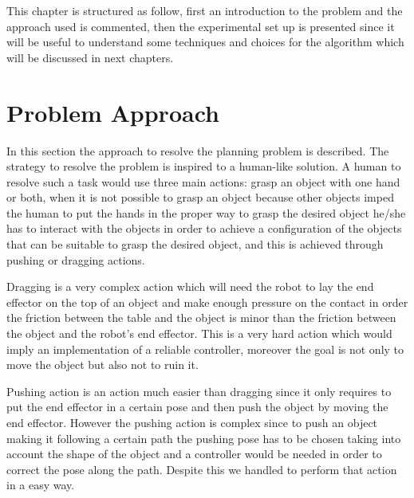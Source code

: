 This chapter is structured as follow, first an introduction to the problem and the approach used is commented, then the experimental set up is presented since it will be useful to understand some techniques and choices for the algorithm which will be discussed in next chapters. 

\section{Problem Approach}
In this section the approach to resolve the planning problem is described. The strategy to resolve the problem is inspired to a human-like solution. A human to resolve such a task would use three main actions: grasp an object with one hand or both, when it is not possible to grasp an object because other objects imped the human to put the hands in the proper way to grasp the desired object he/she has to interact with the objects in order to achieve a configuration of the objects that can be suitable to grasp the desired object, and this is achieved through pushing or dragging actions. 

Dragging is a very complex action which will need the robot to lay the end effector on the top of an object and make enough pressure on the contact in order the friction between the table and the object is minor than the friction between the object and the robot's end effector. This is a very hard action which would imply an implementation of a reliable controller, moreover the goal is not only to move the object but also not to ruin it.

Pushing action is an action much easier than dragging since it only requires to put the end effector in a certain pose and then push the object by moving the end effector. However the pushing action is complex since to push an object making it following a certain path the pushing pose has to be chosen taking into account the shape of the object and a controller would be needed in order to correct the pose along the path. Despite this we handled to perform that action in a easy way.  

